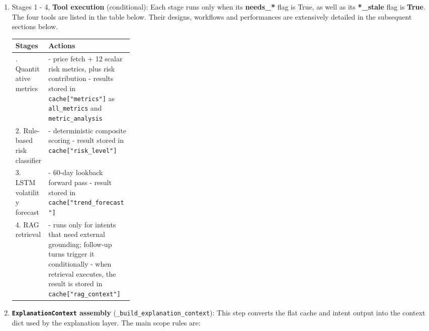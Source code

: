 \begin{enumerate}
    \item Stages 1 - 4, \textbf{Tool execution} (conditional):
    Each stage runs only when its \textbf{needs\_*} flag is True, as well as its \textbf{*\_stale} flag is \textbf{True}. The four tools are listed in the table below. Their designs, workflows and performances are extensively detailed in the subsequent sections below.


{\footnotesize
\setlength{\tabcolsep}{5pt}
\renewcommand{\arraystretch}{1.1}
\noindent\begin{tabularx}{\linewidth}{|>{\raggedright\arraybackslash}p{0.28\linewidth}|>{\raggedright\arraybackslash}X|}
\hline
Stages & Actions \\
\hline

1. Quantitative metrics &
- price fetch + 12 scalar risk metrics, plus risk contribution\newline
- results stored in \texttt{cache["metrics"]} as \texttt{all\_metrics} and \texttt{metric\_analysis}\\
\hline

2. Rule-based risk classifier &
- deterministic composite scoring\newline
- result stored in \texttt{cache["risk\_level"]}\\
\hline

3. LSTM volatility forecast &
- 60-day lookback forward pass\newline
- result stored in \texttt{cache["trend\_forecast"]}\\
\hline

4. RAG retrieval &
- runs only for intents that need external grounding; follow-up turns trigger it conditionally\newline
- when retrieval executes, the result is stored in \texttt{cache["rag\_context"]}\\
\hline

\end{tabularx}
}

    \item \textbf{\texttt{ExplanationContext} assembly} (\texttt{\_build\_explanation\_context}):
    This step converts the flat cache and intent output into the context dict used by the explanation layer. The main scope rules are:


\end{enumerate}
